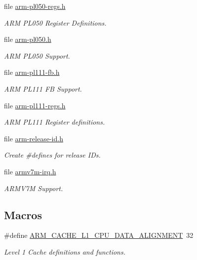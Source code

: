 \begin{DoxyCompactItemize}
file \mbox{\hyperlink{arm-pl050-regs_8h}{arm-\/pl050-\/regs.\+h}}
\begin{DoxyCompactList}\small\item\em A\+RM P\+L050 Register Definitions. \end{DoxyCompactList}\item 
file \mbox{\hyperlink{arm-pl050_8h}{arm-\/pl050.\+h}}
\begin{DoxyCompactList}\small\item\em A\+RM P\+L050 Support. \end{DoxyCompactList}\item 
file \mbox{\hyperlink{arm-pl111-fb_8h}{arm-\/pl111-\/fb.\+h}}
\begin{DoxyCompactList}\small\item\em A\+RM P\+L111 FB Support. \end{DoxyCompactList}\item 
file \mbox{\hyperlink{arm-pl111-regs_8h}{arm-\/pl111-\/regs.\+h}}
\begin{DoxyCompactList}\small\item\em A\+RM P\+L111 Register definitions. \end{DoxyCompactList}\item 
file \mbox{\hyperlink{arm-release-id_8h}{arm-\/release-\/id.\+h}}
\begin{DoxyCompactList}\small\item\em Create \#defines for release I\+Ds. \end{DoxyCompactList}\item 
file \mbox{\hyperlink{armv7m-irq_8h}{armv7m-\/irq.\+h}}
\begin{DoxyCompactList}\small\item\em A\+R\+M\+V7M Support. \end{DoxyCompactList}\end{DoxyCompactItemize}
\subsection*{Macros}
\begin{DoxyCompactItemize}
\item 
\#define \mbox{\hyperlink{group__RTEMSBSPsARMShared_gaca3a3025c199b251e7278a8987c3aab1}{A\+R\+M\+\_\+\+C\+A\+C\+H\+E\+\_\+\+L1\+\_\+\+C\+P\+U\+\_\+\+D\+A\+T\+A\+\_\+\+A\+L\+I\+G\+N\+M\+E\+NT}}~32
\begin{DoxyCompactList}\small\item\em Level 1 Cache definitions and functions. \end{DoxyCompactList}\end{DoxyCompactItemize}


